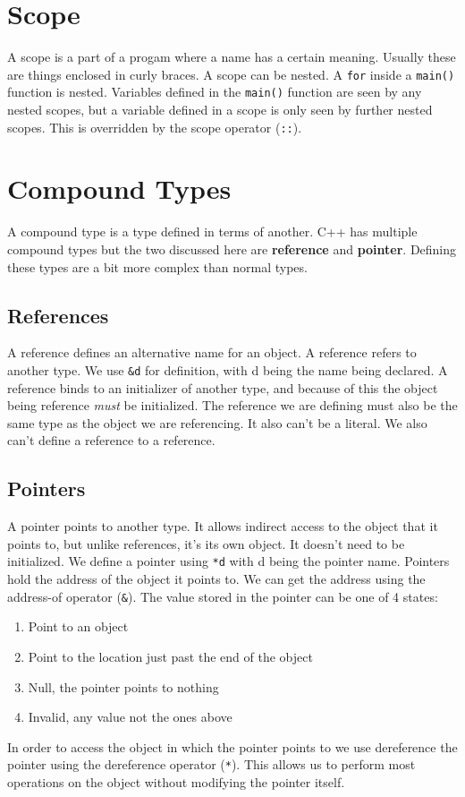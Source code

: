 \documentclass[12pt, a4paper]{report}
\begin{document}
\section{Scope}
A scope is a part of a progam where a name has a certain meaning. Usually these are things enclosed in curly braces. A scope can be nested. A \verb|for| inside a \verb|main()| function is nested. Variables defined in the \verb|main()| function are seen by any nested scopes, but a variable defined in a scope is only seen by further nested scopes. This is overridden by the scope operator (\verb|::|).
\section{Compound Types}
A compound type is a type defined in terms of another. C++ has multiple compound types but the two discussed here are \textbf{reference} and \textbf{pointer}. Defining these types are a bit more complex than normal types.
\subsection{References}
A reference defines an alternative name for an object. A reference refers to another type. We use \verb|&d| for definition, with d being the name being declared. A reference binds to an initializer of another type, and because of this the object being reference \emph{must} be initialized. The reference we are defining must also be the same type as the object we are referencing. It also can't be a literal. We also can't define a reference to a reference.
\subsection{Pointers}
A pointer points to another type. It allows indirect access to the object that it points to, but unlike references, it's its own object.
It doesn't need to be initialized. We define a pointer using \verb|*d| with d being the pointer name. 
Pointers hold the address of the object it points to. We can get the address using the address-of operator (\verb|&|). The value stored in the pointer can be one of 4 states:
\begin{center}
  \begin{enumerate}
    \item Point to an object
    \item Point to the location just past the end of the object
    \item Null, the pointer points to nothing
    \item Invalid, any value not the ones above
  \end{enumerate}
\end{center}
In order to access the object in which the pointer points to we use dereference the pointer using the dereference operator (\verb|*|). This allows us to perform most operations on the object without modifying the pointer itself.
\end{document}

